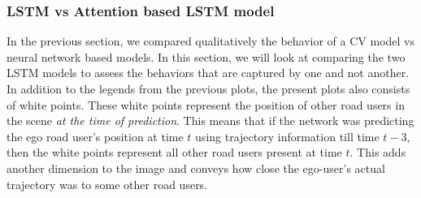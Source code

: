 \documentclass{article}
\begin{document}
\subsubsection{LSTM vs Attention based LSTM model}
In the previous section, we compared qualitatively the behavior of a CV model vs neural network based models. In this section, we will look at comparing the two LSTM models to assess the behaviors that are captured by one and not another. In addition to the legends from the previous plots, the present plots also consists of white points. These white points represent the position of other road users in the scene \textit{at the time of prediction}. This means that if the network was predicting the ego road user's position at time $t$ using trajectory information till time $t-3$, then the white points represent all other road users present at time $t$. This adds another dimension to the image and conveys how close the ego-user's actual trajectory was to some other road users. 
\end{document}
